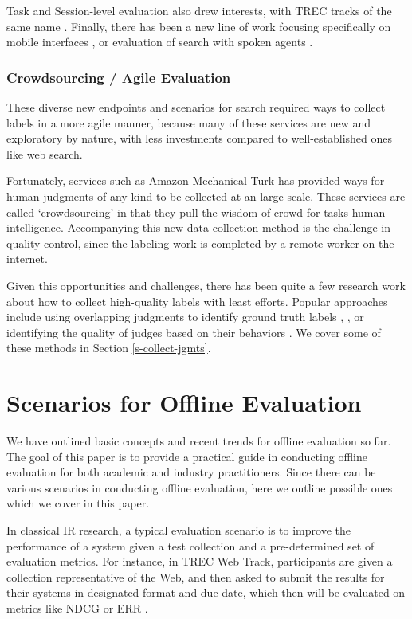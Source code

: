 \documentclass[openany]{now} %
\newcommand{\authornote}[3]{\marginpar{\tiny\color{#1}#2: #3}{\color{#1}{$\star$}}}
\newcommand{\emine}[1]{\authornote{green}{Emine}{#1}}
\begin{document}
Task and Session-level evaluation \cite{KanoulasCCS11, CarteretteKHC14} also drew interests, with TREC tracks of the same name \cite{}. Finally, there has been a new line of work focusing specifically on mobile interfaces \cite{VermaYC16}, or evaluation of search with spoken agents \cite{Kiseleva:2016}.

\subsubsection{Crowdsourcing / Agile Evaluation}

These diverse new endpoints and scenarios for search required ways to collect labels in a more agile manner, because many of these services are new and exploratory by nature, with less investments compared to well-established ones like web search.

Fortunately, services such as Amazon Mechanical Turk has provided ways for human judgments of any kind to be collected at an large scale. These services are called `crowdsourcing' in that they pull the wisdom of crowd for tasks human intelligence. Accompanying this new data collection method is the challenge in quality control, since the labeling work is completed by a remote worker on the internet.

Given this opportunities and challenges, there has been quite a few research work \cite{Alonso2012} about how to collect high-quality labels with least efforts. Popular approaches include using overlapping judgments to identify ground truth labels \cite{Venanzi:2014}, , or identifying the quality of judges based on their behaviors \cite{Kazai:2016}. We cover some of these methods in Section \ref{s-collect-jgmts}.


\section{Scenarios for Offline Evaluation}

We have outlined basic concepts and recent trends for offline evaluation so far. The goal of this paper is to provide a practical guide in conducting offline evaluation for both academic and industry practitioners. Since there can be various scenarios in conducting offline evaluation, here we outline possible ones which we cover in this paper.

In classical IR research, a typical evaluation scenario is to improve the performance of a system given a test collection and a pre-determined set of evaluation metrics. For instance, in TREC Web Track, participants are given a collection representative of the Web, and then asked to submit the results for their systems in designated format and due date, which then will be evaluated on metrics like NDCG \cite{Jarvelin:2002} or ERR \cite{ChapelleMZG09}.
\end{document}
